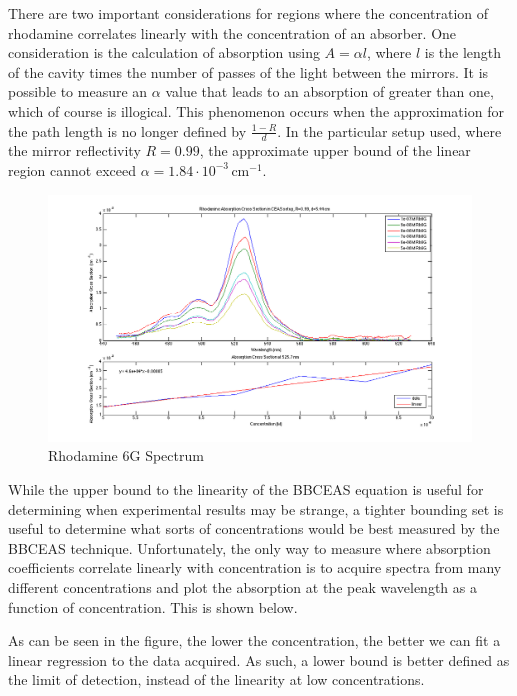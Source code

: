 There are two important considerations for regions where the concentration of
rhodamine correlates linearly with the concentration of an absorber. One
consideration is the calculation of absorption using $A = \alpha  l$, where
$l$ is the length of the cavity times the number of passes of the light
between the mirrors. It is possible to measure an $\alpha$ value that leads to
an absorption of greater than one, which of course is illogical. This
phenomenon occurs when the approximation for the path length is no longer
defined by $\tfrac{1-R}{d}$. In the particular setup used, where the mirror
reflectivity $R=0.99$, the approximate upper bound of the linear region cannot
exceed $\alpha = 1.84\cdot10^{-3}\,\text{cm}^{-1}$.

\begin{figure}
\begin{center}
\includegraphics[width=\textwidth]{figures/Rh6G_absorption_cross_section_and_linearity}
\end{center}
\caption{Rhodamine 6G Spectrum}
\label{fig:rh6g}
\end{figure}

While the upper bound to the linearity of the \ac{BBCEAS} equation is useful
for determining when experimental results may be strange, a tighter bounding
set is useful to determine what sorts of concentrations would be best measured
by the \ac{BBCEAS} technique. Unfortunately, the only way to measure where
absorption coefficients correlate linearly with concentration is to acquire
spectra from many different concentrations and plot the absorption at the peak
wavelength as a function of concentration.
This is shown below.

As can be seen in the figure, the lower the concentration, the better we can
fit a linear regression to the data acquired. As such, a lower bound is better
defined as the limit of detection, instead of the linearity at low
concentrations.

